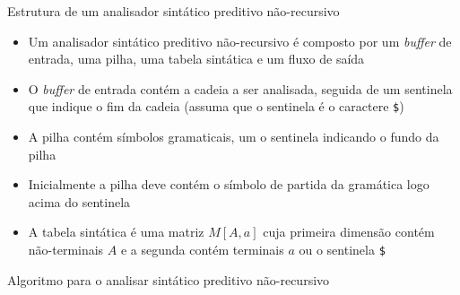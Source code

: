 \begin{frame}[fragile]{Estrutura de um analisador sintático preditivo não-recursivo}

    \begin{itemize}
        \item Um analisador sintático preditivo não-recursivo é composto por um \textit{buffer} de entrada, uma pilha, uma tabela sintática e um fluxo de saída
        \pause

        \item O \textit{buffer} de entrada contém a cadeia a ser analisada, seguida de um sentinela que indique o fim da cadeia (assuma que o sentinela é o
            caractere \texttt{\$})
        \pause

        \item A pilha contém símbolos gramaticais, um o sentinela indicando o fundo da pilha
        \pause

        \item Inicialmente a pilha deve contém o símbolo de partida da gramática logo acima do sentinela
        \pause
    
        \item A tabela sintática é uma matriz $M[A, a]$ cuja primeira dimensão contém não-terminais $A$ e a segunda contém terminais $a$ ou o sentinela
            \texttt{\$}
    \end{itemize}

\end{frame}

\begin{frame}[fragile]{Algoritmo para o analisar sintático preditivo não-recursivo}

    \begin{algorithmic}[1]

        \vspace{0.1in}

        \Repeat
                \Else
                \EndIf
    \end{algorithmic}

\end{frame}

